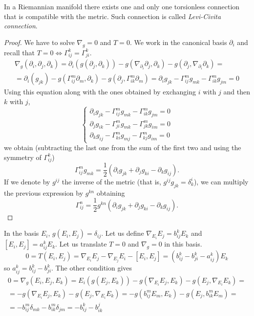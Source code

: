 \documentclass[a4paper,12pt]{book}
\begin{document}
\begin{theorem}
In a Riemannian manifold there exists one and only one torsionless connection that is compatible with the metric. Such connection is called \emph{Levi-Civita connection}.
\end{theorem}

\begin{proof}
We have to solve $\nabla_g=0$ and $T=0$. We work in the canonical basis $\partial_i$ and recall that $T=0\iff\Gamma_{ij}^k=\Gamma_{ji}^k$.
\begin{multline*}\nabla_g(\partial_i,\partial_j,\partial_k)=\partial_i(g(\partial_j,\partial_k))-g(\nabla_{\partial_i}\partial_j,\partial_k)-g(\partial_j,\nabla_{\partial_i}\partial_k)=\\
=\partial_i(g_{jk})-g(\Gamma_{ij}^m\partial_m,\partial_k)-g(\partial_j,\Gamma_{ik}^m\partial_m)=\partial_ig_{jk}-\Gamma_{ij}^mg_{mk}-\Gamma_{ik}^mg_{jm}=0\end{multline*}
Using this equation along with the ones obtained by exchanging $i$ with $j$ and then $k$ with $j$,
\[\begin{cases}
\partial_ig_{jk}-\Gamma_{ij}^mg_{mk}-\Gamma_{ik}^mg_{jm}=0\\
\partial_jg_{ik}-\Gamma_{ji}^mg_{mk}-\Gamma_{jk}^mg_{im}=0\\
\partial_kg_{ij}-\Gamma_{ki}^mg_{mj}-\Gamma_{kj}^mg_{im}=0
\end{cases}\]
we obtain (subtracting the last one from the sum of the first two and using the symmetry of $\Gamma_{ij}^k$)
\[\Gamma_{ij}^mg_{mk}=\frac{1}{2}(\partial_ig_{jk}+\partial_jg_{ki}-\partial_kg_{ij}).\]
If we denote by $g^{ij}$ the inverse of the metric (that is, $g^{ij}g_{jk}=\delta^i_k$), we can multiply the previous expression by $g^{kn}$ obtaining
\[\Gamma_{ij}^n=\frac{1}{2}g^{kn}(\partial_ig_{jk}+\partial_jg_{ki}-\partial_kg_{ij}).\]
\end{proof}
In the basis $E_i$, $g(E_i,E_j)=\delta_{ij}$. Let us define $\nabla_{E_i}E_j=b_{ij}^kE_k$ and $[E_i,E_j]=a_{ij}^kE_k$. Let us translate $T=0$ and $\nabla_g=0$ in this basis.
\[0=T(E_i,E_j)=\nabla_{E_i}E_j-\nabla_{E_j}E_i-[E_i,E_j]=(b_{ij}^k-b_{ji}^k-a_{ij}^k)E_k\]
so $a_{ij}^k=b_{ij}^k-b_{ji}^k$. The other condition gives
\begin{multline*}
0=\nabla_g(E_i,E_j,E_k)=E_i(g(E_j,E_k))-g(\nabla_{E_i}E_j,E_k)-g(E_j,\nabla_{E_i}E_k)=\\
=-g(\nabla_{E_i}E_j,E_k)-g(E_j,\nabla_{E_i}E_k)=-g(b_{ij}^mE_m,E_k)-g(E_j,b_{ik}^mE_m)=\\
=-b_{ij}^m\delta_{mk}-b_{ik}^m\delta_{jm}=-b_{ij}^k-b_{ik}^j\end{multline*}
\end{document}
